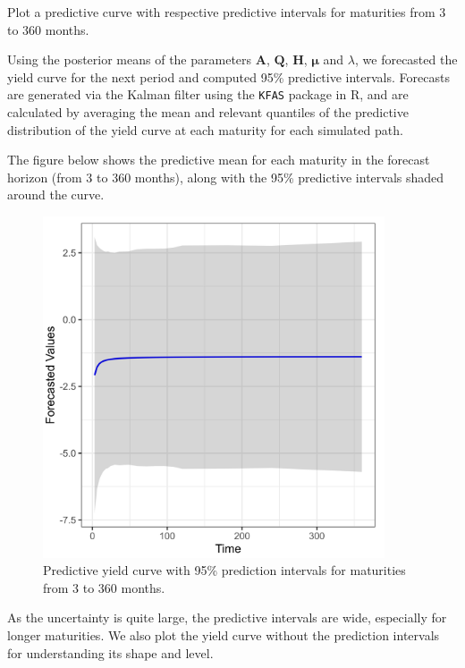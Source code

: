 Plot a predictive curve with respective predictive intervals for maturities from 3 to 360 months.

Using the posterior means of the parameters $\mathbf{A}$, $\mathbf{Q}$, $\mathbf{H}$, $\mathbf{\mu}$ and $\lambda$, we forecasted the yield curve for the next period and computed 95\% predictive intervals. Forecasts are generated via the Kalman filter using the \texttt{KFAS} package in R, and are calculated by averaging the mean and relevant quantiles of the predictive distribution of the yield curve at each maturity for each simulated path. 

The figure below shows the predictive mean for each maturity in the forecast horizon (from 3 to 360 months), along with the 95\% predictive intervals shaded around the curve.

\begin{figure}[h!]
    \centering
    \includegraphics[width=0.9\textwidth]{../figures/forecast.png}
    \caption{Predictive yield curve with 95\% prediction intervals for maturities from 3 to 360 months.}
\end{figure}

As the uncertainty is quite large, the predictive intervals are wide, especially for longer maturities. We also plot the yield curve without the prediction intervals for understanding its shape and level.


